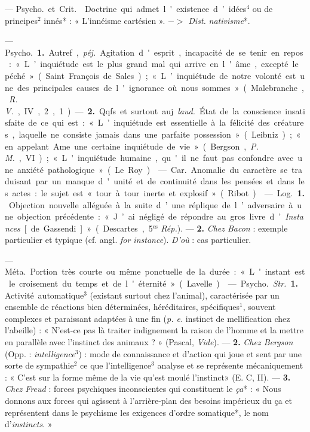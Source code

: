 \begin{itemize}[leftmargin=1cm, label=, itemsep=1pt]
 — \si{Psycho.} et \si{Crit.}  Doctrine qui admet
l'existence d’idées$^4$ ou de prineipes$^2$ innés* : « L’innéisme
cartésien ». $->$ {\it Dist.} {\it nativisme}*.

 — \si{Psycho.} {\bf 1.} Autref., {\it péj.} Agitation
d'esprit, incapacité de se tenir en repos : « L’inquiétude est le plus grand
mal qui arrive en l'âme,
excepté le péché » (Saint François de Sales); « L’inquiétude de notre volonté
est une des principales causes de l'ignorance où nous sommes » (Malebranche,
{\it R. V.}, IV, 2, 1). — {\bf 2.} Qqfs. et surtout auj. {\it laud.} État de
la conscience insatisfaite de ce qui est : « L’inquiétude est essentielle à
la félicité des créatures, laquelle ne consiste jamais dans une parfaite
possession » (Leibniz); « ... en appelant Ame une certaine inquiétude de
vie » (Bergson, {\it P. M.}, VI); « L'inquiétude humaine, qu'il ne faut pas
confondre avec une anxiété pathologique... » (Le Roy).

 — \si{Car.} Anomalie du caractère se traduisant par
un manque d'unité et de continuité dans les pensées et dans les actes : le
sujet est « tour à tour inerte et explosif » (Ribot).

 — \si{Log.} {\bf 1.} Objection nouvelle alléguée à la suite
d’une réplique de l’adversaire à une objection précédente : « J’ai négligé de
répondre au gros livre d’{\it Instances} [de Gassendi] » (Descartes,
5$^\text{es}$ {\it Rép.}). — {\bf 2.} {\it Chez Bacon} : exemple particulier
et typique (cf. angl. {\it for instance}). {\it D'où} : cas particulier.

 — \si{Méta.} Portion très courte ou même ponctuelle de la
durée : « L'instant est le croisement du temps et de l'éternité » (Lavelle).

 — \si{Psycho.} {\it Str.} {\bf 1.} Activité automatique$^3$
(existant surtout chez l'animal), caractérisée par un ensemble de réactions
bien déterminées, héréditaires, spécifiques$^1$, souvent complexes et
paraissant adaptées à une fin ({\it p. e.} instinct de mellification chez
l’abeille) : « N’est-ce pas là traiter indignement la
raison de l’homme et la mettre en parallèle avec l'instinct des
animaux ? » (Pascal, {\it Vide}). — {\bf 2.} {\it Chez Bergson} (Opp. :
{\it intelligence}$^3$) : mode de connaissance et d’action qui joue et sent
par une sorte de sympathie$^2$ ce que l'intelligence$^3$ analyse et se
représente mécaniquement : « C’est sur la forme même de la vie qu'est moulé
l'instinct» (E. C, II). —  {\bf 3.} {\it Chez Freud} : forces psychiques
inconscientes qui constituent le {\it ça}* : « Nous donnons aux forces qui
agissent à l'arrière-plan des besoins impérieux du ça et représentent dans le
psychisme les exigences d’ordre somatique*, le nom d’{\it instincts}. »


\end{itemize}
